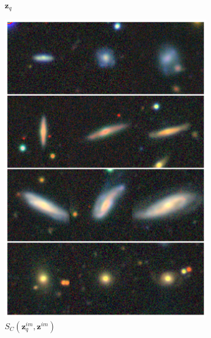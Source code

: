\documentclass[a4paper,12pt]{article}
\begin{document}
\begin{figure}[H]
\begin{subfigure}{0.08\textwidth}
        \caption{$\mathbf{z}_q$}
        \label{fig:retrieval_1}
    \end{subfigure}%
    \hfill
    \begin{subfigure}{0.22\textwidth}
        \centering
        \includegraphics[height=0.21\textheight]{../figures/images_im_im.png}
        \caption{$S_C(\mathbf{z}_q^{im}, \mathbf{z}^{im})$}
        \label{fig:retrieval_2}
    \end{subfigure}%
    \hfill
    \begin{subfigure}{0.22\textwidth}
        \centering

\end{subfigure}
\end{figure}
\end{document}
